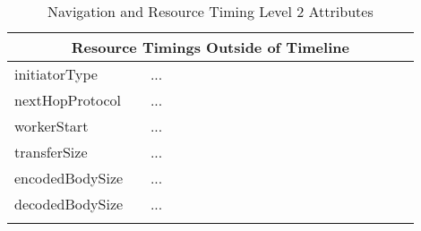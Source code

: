 \begin{center}
\begin{longtable}{ | p{0.3\linewidth} | p{0.6\linewidth} | }
	\hline
	\multicolumn{2}{|c|}{ \cellcolor{lightgrey} Resource Timings Outside of Timeline} \\
	\hline
	initiatorType & ... \\
	\hline
	nextHopProtocol & ... \\
	\hline
	workerStart & ... \\
	\hline
	transferSize & ... \\
	\hline
	encodedBodySize & ... \\
	\hline
	decodedBodySize & ... \\
	\hline
	
	\caption{Navigation and Resource Timing Level 2 Attributes} %
	\label{tab:navigationtiming}
	\end{longtable}
\end{center}



















